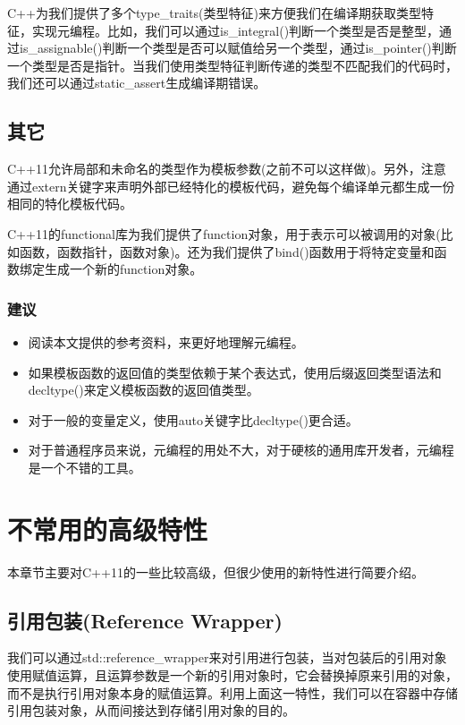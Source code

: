 \documentclass{ctexart}
\begin{document}
C++为我们提供了多个type\_traits(类型特征)来方便我们在编译期获取类型特征，实现元编程。比如，我们可以通过is\_integral()判断一个类型是否是整型，通过is\_assignable()判断一个类型是否可以赋值给另一个类型，通过is\_pointer()判断一个类型是否是指针。当我们使用类型特征判断传递的类型不匹配我们的代码时，我们还可以通过static\_assert生成编译期错误。

\subsection{其它}

C++11允许局部和未命名的类型作为模板参数(之前不可以这样做)。另外，注意通过extern关键字来声明外部已经特化的模板代码，避免每个编译单元都生成一份相同的特化模板代码。

C++11的functional库为我们提供了function对象，用于表示可以被调用的对象(比如函数，函数指针，函数对象)。还为我们提供了bind()函数用于将特定变量和函数绑定生成一个新的function对象。

\subsubsection*{建议}

\begin{itemize}
	\item 阅读本文提供的参考资料，来更好地理解元编程。
	\item 如果模板函数的返回值的类型依赖于某个表达式，使用后缀返回类型语法和decltype()来定义模板函数的返回值类型。
	\item 对于一般的变量定义，使用auto关键字比decltype()更合适。
	\item 对于普通程序员来说，元编程的用处不大，对于硬核的通用库开发者，元编程是一个不错的工具。
\end{itemize}

\newpage
\section{不常用的高级特性}

本章节主要对C++11的一些比较高级，但很少使用的新特性进行简要介绍。

\subsection{引用包装(Reference Wrapper)}

我们可以通过std::reference\_wrapper来对引用进行包装，当对包装后的引用对象使用赋值运算，且运算参数是一个新的引用对象时，它会替换掉原来引用的对象，而不是执行引用对象本身的赋值运算。利用上面这一特性，我们可以在容器中存储引用包装对象，从而间接达到存储引用对象的目的。
\end{document}
